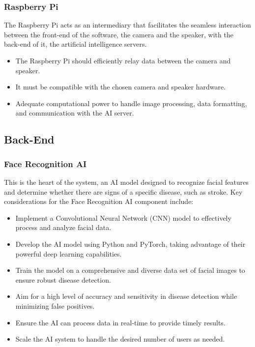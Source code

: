         \subsubsection{Raspberry Pi}
            The Raspberry Pi acts as an intermediary that facilitates the seamless interaction between the front-end of the software, the camera and the speaker, with the back-end of it, the artificial intelligence servers.
            \begin{itemize}
                \item The Raspberry Pi should efficiently relay data between the camera and speaker.
                \item It must be compatible with the chosen camera and speaker hardware.
                \item Adequate computational power to handle image processing, data formatting, and communication with the AI server.
            \end{itemize}
    \subsection{Back-End}
        \subsubsection{Face Recognition AI}
            This is the heart of the system, an AI model designed to recognize facial features and determine whether there are signs of a specific disease, such as stroke. Key considerations for the Face Recognition AI component include:
            \begin{itemize}
                \item Implement a Convolutional Neural Network (CNN) model to effectively process and analyze facial data.
                \item Develop the AI model using Python and PyTorch, taking advantage of their powerful deep learning capabilities.
                \item Train the model on a comprehensive and diverse data set of facial images to ensure robust disease detection.
                \item Aim for a high level of accuracy and sensitivity in disease detection while minimizing false positives.
                \item Ensure the AI can process data in real-time to provide timely results.
                \item Scale the AI system to handle the desired number of users as needed.
            \end{itemize}
